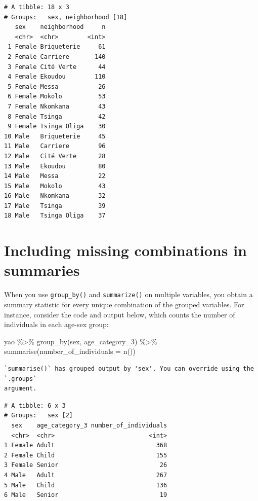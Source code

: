 \documentclass[
  letterpaper,
  DIV=11,
  numbers=noendperiod]{scrreprt}
\newenvironment{Shaded}{\begin{snugshade}}{\end{snugshade}}
\newcommand{\AttributeTok}[1]{\textcolor[rgb]{0.40,0.45,0.13}{#1}}
\newcommand{\FunctionTok}[1]{\textcolor[rgb]{0.28,0.35,0.67}{#1}}
\newcommand{\NormalTok}[1]{\textcolor[rgb]{0.00,0.23,0.31}{#1}}
\newcommand{\SpecialCharTok}[1]{\textcolor[rgb]{0.37,0.37,0.37}{#1}}
\begin{document}
\begin{verbatim}
# A tibble: 18 x 3
# Groups:   sex, neighborhood [18]
   sex    neighborhood     n
   <chr>  <chr>        <int>
 1 Female Briqueterie     61
 2 Female Carriere       140
 3 Female Cité Verte      44
 4 Female Ekoudou        110
 5 Female Messa           26
 6 Female Mokolo          53
 7 Female Nkomkana        43
 8 Female Tsinga          42
 9 Female Tsinga Oliga    30
10 Male   Briqueterie     45
11 Male   Carriere        96
12 Male   Cité Verte      28
13 Male   Ekoudou         80
14 Male   Messa           22
15 Male   Mokolo          43
16 Male   Nkomkana        32
17 Male   Tsinga          39
18 Male   Tsinga Oliga    37
\end{verbatim}

\hypertarget{including-missing-combinations-in-summaries}{%
\section{Including missing combinations in
summaries}\label{including-missing-combinations-in-summaries}}

When you use \texttt{group\_by()} and \texttt{summarize()} on multiple
variables, you obtain a summary statistic for every unique combination
of the grouped variables. For instance, consider the code and output
below, which counts the number of individuals in each age-sex group:

\begin{Shaded}
\begin{Highlighting}[]
\NormalTok{yao }\SpecialCharTok{\%\textgreater{}\%} 
  \FunctionTok{group\_by}\NormalTok{(sex, age\_category\_3) }\SpecialCharTok{\%\textgreater{}\%} 
  \FunctionTok{summarise}\NormalTok{(}\AttributeTok{number\_of\_individuals =} \FunctionTok{n}\NormalTok{()) }
\end{Highlighting}
\end{Shaded}

\begin{verbatim}
`summarise()` has grouped output by 'sex'. You can override using the `.groups`
argument.
\end{verbatim}

\begin{verbatim}
# A tibble: 6 x 3
# Groups:   sex [2]
  sex    age_category_3 number_of_individuals
  <chr>  <chr>                          <int>
1 Female Adult                            368
2 Female Child                            155
3 Female Senior                            26
4 Male   Adult                            267
5 Male   Child                            136
6 Male   Senior                            19
\end{verbatim}
\end{document}
